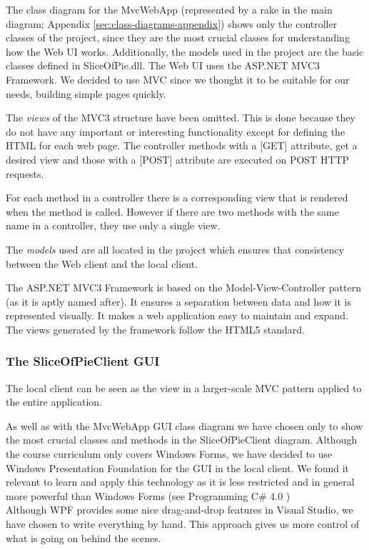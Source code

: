 The class diagram for the MvcWebApp (represented by a rake in the main diagram; Appendix \ref{sec:class-diagrams-appendix}) shows only the controller
classes of the project, since they are the most crucial classes for understanding how the Web UI works. Additionally, the models used in the project
are the basic classes defined in SliceOfPie.dll. The Web UI uses the ASP.NET MVC3 Framework. We decided to use MVC since we thought it to be suitable
for our needs, building simple pages quickly.

The \emph{views} of the MVC3 structure have been omitted. This is done because they do not have any important or interesting functionality except for
defining the HTML for each web page. The controller methods with a [GET] attribute, get a desired view and those with a [POST] attribute are executed on
POST HTTP requests.

For each method in a controller there is a corresponding view that is rendered when the method is called. However if there are two methods with the same 
name in a controller, they use only a single view.

The \emph{models} used are all located in the \SOP{} project which ensures that consistency between the Web client and the local client.

The ASP.NET MVC3 Framework is based on the Model-View-Controller pattern (as it is aptly named after). It ensures a separation between data and how
it is represented visually. It makes a web application easy to maintain and expand. The views generated by the framework follow the HTML5 standard.

\subsubsection{The SliceOfPieClient GUI}

The local client can be seen as the view in a larger-scale MVC pattern applied to the entire application.

As well as with the MvcWebApp GUI class diagram we have chosen only to show the most crucial classes and methods in the SliceOfPieClient diagram.
Although the course curriculum only covers Windows Forms, we have decided to use Windows Presentation Foundation for the GUI in the local client. We found it relevant to learn and apply this technology as it is less restricted and in general more powerful than Windows Forms (see Programming C\# 4.0  \cite[p.795-796]{Griffiths2010}) \\
Although WPF provides some nice drag-and-drop features in Visual Studio, we have chosen to write everything by hand. This approach gives us more control of what is going on behind the scenes.

